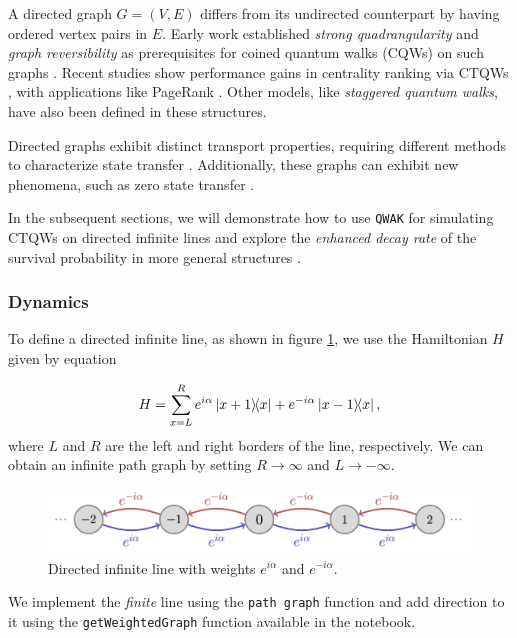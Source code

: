 \documentclass[main.tex]{subfiles}
\begin{document}
A directed graph $G=(V,E)$ differs from its undirected counterpart by having
ordered vertex pairs in $E$. Early work established \textit{strong
quadrangularity} and \textit{graph reversibility} as prerequisites for coined
quantum walks (CQWs) on such graphs
\cite{severiniUnderlying03,severiniDigraph03,montanaroQuantum05}. Recent
studies show performance gains in centrality ranking via CTQWs
\cite{Caruso2016}, with applications like PageRank \cite{Wang2020}. Other
models, like \textit{staggered quantum walks}, have also been defined
\cite{chagas20} in these structures.

Directed graphs exhibit distinct transport properties, requiring different
methods to characterize state transfer \cite{godsilPerfect2020}. Additionally,
these graphs can exhibit new phenomena, such as zero state transfer \cite{Sett2019}.

In the subsequent sections, we will demonstrate how to use \texttt{QWAK} for
simulating CTQWs on directed infinite lines and explore the \textit{enhanced
decay rate} of the survival probability \cite{abalEffects06} in more general
structures \cite{Chaves2023}.

\subsubsection{Dynamics}

To define a directed infinite line, as shown in figure \ref{fig:oriented_line},
we use the Hamiltonian $H$ given by equation 

\begin{equation}\label{hamiltonian}
    H = \sum_{x = L}^{R}e^{i\alpha}\ketbra{x+1}{x}+e^{-i\alpha}\ketbra{x-1}{x},
\end{equation}
where $L$ and $R$ are the left and right borders of
the line, respectively. We can obtain an infinite path graph by setting
$R\rightarrow\infty$ and $L\rightarrow -\infty$. 

\begin{figure}[!h]
    \centering
    \includegraphics[width=12cm]{oriented_infinite_line.png}
    \caption{Directed infinite line with weights $e^{i\alpha}$ and $e^{-i\alpha}$.}
    \label{fig:oriented_line}
\end{figure}

We implement the \textit{finite} line using the \texttt{path\textunderscore
graph} function and add direction to it using the \texttt{getWeightedGraph}
function available in the notebook.
\end{document}
